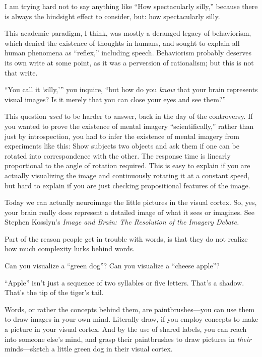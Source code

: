 {
 I am trying hard not to say anything like ``How
spectacularly silly,'' because there is always the
hindsight effect to consider, but: how spectacularly silly.}

{
 This academic paradigm, I think, was mostly a deranged legacy of
behaviorism, which denied the existence of thoughts in humans, and
sought to explain all human phenomena as
``reflex,'' including speech.
Behaviorism probably deserves its own write at some point, as it was a
perversion of rationalism; but this is not that write.}

{
 ``You call it
`silly,''' you
inquire, ``but how do you \textit{know} that your
brain represents visual images? Is it merely that you can close your
eyes and see them?''}

{
 This question \textit{used} to be harder to answer, back in the
day of the controversy. If you wanted to prove the existence of mental
imagery ``scientifically,'' rather
than just by introspection, you had to infer the existence of mental
imagery from experiments like this: Show subjects two objects and ask
them if one can be rotated into correspondence with the other. The
response time is linearly proportional to the angle of rotation
required. This is easy to explain if you are actually visualizing the
image and continuously rotating it at a constant speed, but hard to
explain if you are just checking propositional features of the image.}

{
 Today we can actually neuroimage the little pictures in the visual
cortex. So, yes, your brain really does represent a detailed image of
what it sees or imagines. See Stephen Kosslyn's
\textit{Image and Brain: The Resolution of the Imagery
Debate.}}

{
 Part of the reason people get in trouble with words, is that they
do not realize how much complexity lurks behind words.}

{
 Can you visualize a ``green
dog''? Can you visualize a ``cheese
apple''?}

{
 ``Apple'' isn't
just a sequence of two syllables or five letters.
That's a shadow. That's the tip of the
tiger's tail.}

{
 Words, or rather the concepts behind them, are paintbrushes---you
can use them to draw images in your own mind. Literally draw, if you
employ concepts to make a picture in your visual cortex. And by the use
of shared labels, you can reach into someone else's
mind, and grasp their paintbrushes to draw pictures in \textit{their}
minds---sketch a little green dog in their visual cortex.}

